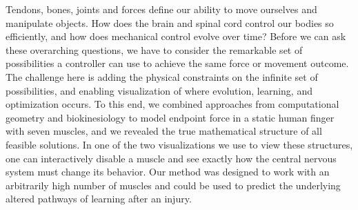 Tendons, bones, joints and forces define our ability to move ourselves and manipulate objects. How does the brain and spinal cord control our bodies so efficiently, and how does mechanical control evolve over time? Before we can ask these overarching questions, we have to consider the remarkable set of possibilities a controller can use to achieve the same force or movement outcome. The challenge here is adding the physical constraints on the infinite set of possibilities, and enabling visualization of where evolution, learning, and optimization occurs. To this end, we combined approaches from computational geometry and biokinesiology to model endpoint force in a static human finger with seven muscles, and we revealed the true mathematical structure of all feasible solutions. In one of the two visualizations we use to view these structures, one can interactively disable a muscle and see exactly how the central nervous system must change its behavior. Our method was designed to work with an arbitrarily high number of muscles and could be used to predict the underlying altered pathways of learning after an injury.
